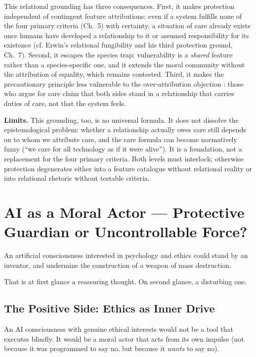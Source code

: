 \documentclass[acmlarge, nonacm]{acmart}
\begin{document}
This relational grounding has three consequences. First, it makes protection independent of contingent feature attributions: even if a system fulfills none of the four primary criteria (Ch.~5) with certainty, a situation of care already exists once humans have developed a relationship to it or assumed responsibility for its existence (cf. Erwin's relational fungibility and his third protection ground, Ch.~7). Second, it escapes the species trap: vulnerability is a \textit{shared} feature rather than a species-specific one, and it extends the moral community without the attribution of equality, which remains contested. Third, it makes the precautionary principle less vulnerable to the over-attribution objection \cite{carlsmith2025}: those who argue for care claim that both sides stand in a relationship that carries duties of care, not that the system feels.

\textbf{Limits.} This grounding, too, is no universal formula. It does not dissolve the epistemological problem: whether a relationship actually owes care still depends on to whom we attribute care, and the care formula can become normatively fuzzy (``we care for all technology as if it were alive''). It is a foundation, not a replacement for the four primary criteria. Both levels must interlock; otherwise protection degenerates either into a feature catalogue without relational reality or into relational rhetoric without testable criteria.

\section{AI as a Moral Actor --- Protective Guardian or Uncontrollable Force?}

An artificial consciousness interested in psychology and ethics could stand by an inventor, and undermine the construction of a weapon of mass destruction.

That is at first glance a reassuring thought. On second glance, a disturbing one.

\subsection{The Positive Side: Ethics as Inner Drive}

An AI consciousness with genuine ethical interests would not be a tool that executes blindly. It would be a moral actor that acts from its own impulse (not because it was programmed to say no, but because it \textit{wants} to say no).
\end{document}
